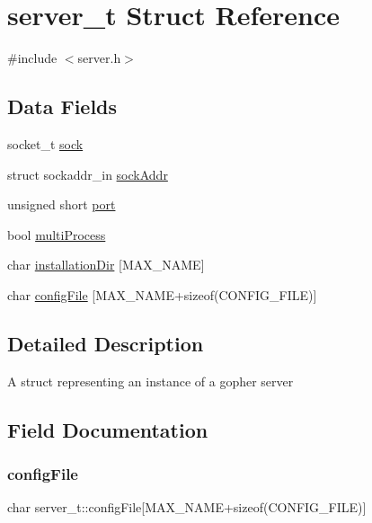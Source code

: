 \hypertarget{structserver__t}{}\section{server\+\_\+t Struct Reference}
\label{structserver__t}


{\ttfamily \#include $<$server.\+h$>$}

\subsection*{Data Fields}
\begin{DoxyCompactItemize}
\item 
socket\+\_\+t \hyperlink{structserver__t_a51c1726304d4644523c35656c5f9b20b}{sock}
\item 
struct sockaddr\+\_\+in \hyperlink{structserver__t_a515d831aa349c908c0a2c0e86b5e1c43}{sock\+Addr}
\item 
unsigned short \hyperlink{structserver__t_ac60a631d2267e34f3b5dd3555ae3ab43}{port}
\item 
bool \hyperlink{structserver__t_a04e5158f927016ae6577600862d8750d}{multi\+Process}
\item 
char \hyperlink{structserver__t_ae5ccab8bd0fb6744f89ae6a7e13d8553}{installation\+Dir} \mbox{[}M\+A\+X\+\_\+\+N\+A\+ME\mbox{]}
\item 
char \hyperlink{structserver__t_ac2d407054762f70d9feaf8e7998e6720}{config\+File} \mbox{[}M\+A\+X\+\_\+\+N\+A\+ME+sizeof(C\+O\+N\+F\+I\+G\+\_\+\+F\+I\+LE)\mbox{]}
\end{DoxyCompactItemize}


\subsection{Detailed Description}
A struct representing an instance of a gopher server 

\subsection{Field Documentation}
\mbox{\label{structserver__t_ac2d407054762f70d9feaf8e7998e6720}} 
\subsubsection{\texorpdfstring{config\+File}{configFile}}
{\footnotesize\ttfamily char server\+\_\+t\+::config\+File\mbox{[}M\+A\+X\+\_\+\+N\+A\+ME+sizeof(C\+O\+N\+F\+I\+G\+\_\+\+F\+I\+LE)\mbox{]}}


